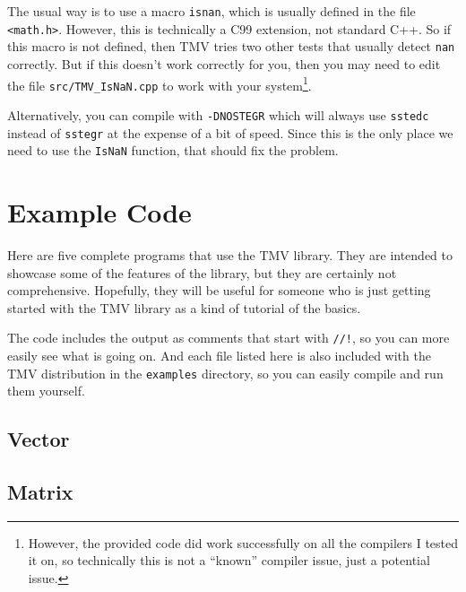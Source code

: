 \documentclass[twoside,letterpaper,11pt]{article}
\renewcommand{\tt}[1]{{\lstinline {#1}}}
\newcommand{\inputcode}[1]{}
\begin{document}
\begin{itemize}
The usual way is to use a macro \tt{isnan}, which is usually
defined in the file \tt{<math.h>}.  However, this is technically a C99 extension,
not standard C++.  So if this macro is not defined, then TMV tries two other
tests that usually detect \tt{nan} correctly.  But if this doesn't work correctly
for you, then you may need to edit the file \texttt{src/TMV\_IsNaN.cpp} to work
with your system\footnote{
However, the provided code did work successfully on all the compilers I 
tested it on, so technically this is not a ``known'' compiler issue, just a 
potential issue.}.

Alternatively, you can compile with \texttt{-DNOSTEGR} which will always
use \tt{sstedc} instead of \tt{sstegr} at the expense of a bit of speed.
Since this is the only place we need to use the \tt{IsNaN} function, that 
should fix the problem.

\end{itemize}


\newpage
\section{Example Code}

Here are five complete programs that use the TMV library.  They are intended to showcase
some of the features of the library, but they are certainly not comprehensive.  Hopefully,
they will be useful for someone who is just getting started with the TMV library as a 
kind of tutorial of the basics.


The code includes the output as comments that start with \lstinline{//!}, so you can more easily see what is going on.
And each file listed here is also included with the TMV distribution in the \texttt{examples}
directory, so you can easily compile and run them yourself.

\newpage
\subsection{Vector}

\inputcode{../examples/Vector.cpp}
%
%
\vspace{12pt}

\newpage
\subsection{Matrix}
\end{document}
